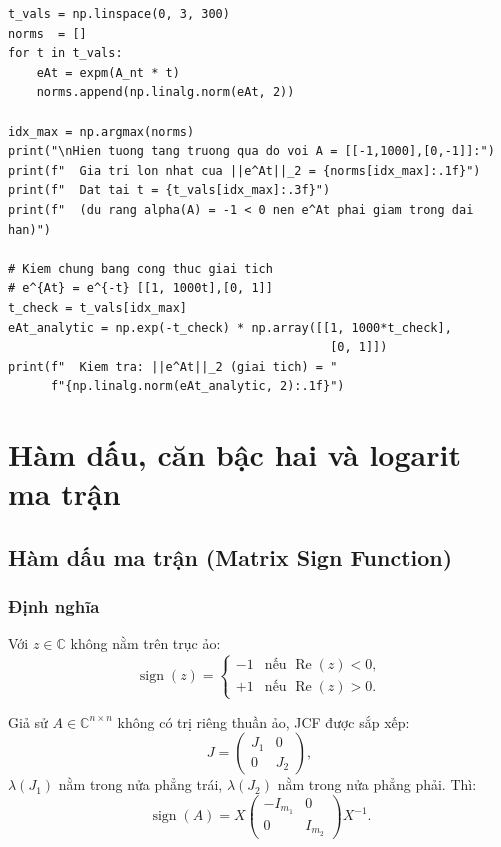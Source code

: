 \documentclass[12pt,a4paper]{report}
\newcommand{\C}{\mathbb{C}}
\newcommand{\sign}{\operatorname{sign}}
\DeclareMathOperator{\re}{Re}
\begin{document}
\begin{lstlisting}[style=python, caption={Hàm mũ ma trận: Scaling and Squaring + Padé, và hiện tượng transient growth}]
t_vals = np.linspace(0, 3, 300)
norms  = []
for t in t_vals:
    eAt = expm(A_nt * t)
    norms.append(np.linalg.norm(eAt, 2))

idx_max = np.argmax(norms)
print("\nHien tuong tang truong qua do voi A = [[-1,1000],[0,-1]]:")
print(f"  Gia tri lon nhat cua ||e^At||_2 = {norms[idx_max]:.1f}")
print(f"  Dat tai t = {t_vals[idx_max]:.3f}")
print(f"  (du rang alpha(A) = -1 < 0 nen e^At phai giam trong dai han)")

# Kiem chung bang cong thuc giai tich
# e^{At} = e^{-t} [[1, 1000t],[0, 1]]
t_check = t_vals[idx_max]
eAt_analytic = np.exp(-t_check) * np.array([[1, 1000*t_check],
                                             [0, 1]])
print(f"  Kiem tra: ||e^At||_2 (giai tich) = "
      f"{np.linalg.norm(eAt_analytic, 2):.1f}")
\end{lstlisting}

\section{Hàm dấu, căn bậc hai và logarit ma trận}
\label{sec:signlogsqrt}

\subsection{Hàm dấu ma trận (Matrix Sign Function)}

\subsubsection{Định nghĩa}

Với $z \in \C$ không nằm trên trục ảo:
\[
  \sign(z) = \begin{cases} -1 & \text{nếu } \re(z) < 0, \\ +1 & \text{nếu } \re(z) > 0. \end{cases}
\]

Giả sử $A \in \C^{n\times n}$ không có trị riêng thuần ảo, JCF được sắp xếp:
\[
  J = \begin{pmatrix} J_1 & 0 \\ 0 & J_2 \end{pmatrix},
\]
$\lambda(J_1)$ nằm trong nửa phẳng trái, $\lambda(J_2)$ nằm trong nửa phẳng phải. Thì:
\[
  \sign(A) = X \begin{pmatrix} -I_{m_1} & 0 \\ 0 & I_{m_2} \end{pmatrix} X^{-1}.
\]
\end{document}
